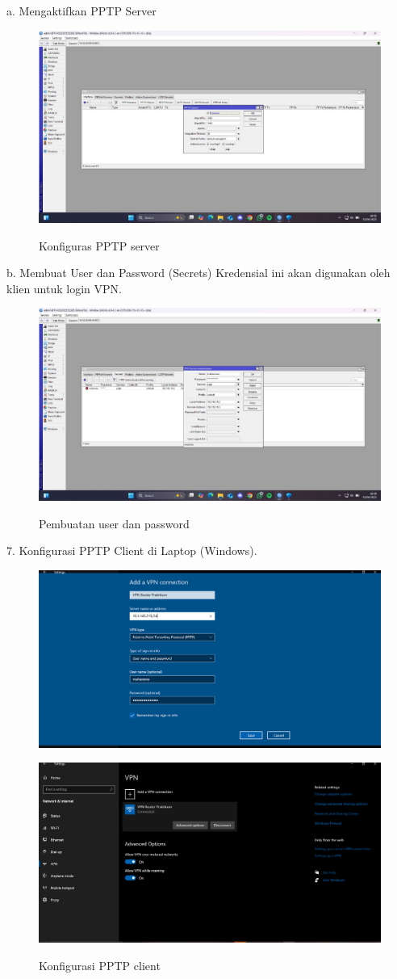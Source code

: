 a. Mengaktifkan PPTP Server
\begin{figure}[H]
    \centering
    \includegraphics[width=0.65\linewidth]{image/tun10.jpg}
    \label{fig:inirujukan}
    \caption{Konfiguras PPTP server}
\end{figure}
b. Membuat User dan Password (Secrets) Kredensial ini akan digunakan oleh klien untuk login VPN.
\begin{figure}[H]
    \centering
    \includegraphics[width=0.65\linewidth]{image/tun11.jpg}
    \label{fig:inirujukan}
    \caption{Pembuatan user dan password}
\end{figure}
7. Konfigurasi PPTP Client di Laptop (Windows). 
\begin{figure}[H]
    \centering
    \includegraphics[width=0.65\linewidth]{image/tun1.png}
    \label{fig:inirujukan}
\end{figure}
\begin{figure}[H]
    \centering
    \includegraphics[width=0.65\linewidth]{image/tun2.png}
    \label{fig:inirujukan}
    \caption{Konfigurasi PPTP client}
\end{figure}
